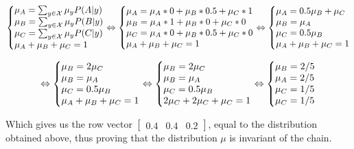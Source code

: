 \documentclass{article}
\begin{document}
\begin{equation}
    \left\{\begin{array}{@{}l@{}}
        \mu_{A} = \sum_{y \in \mathcal{X}} \mu_{y}P(A | y)\\
        \mu_{B} = \sum_{y \in \mathcal{X}} \mu_{y}P(B | y)\\
        \mu_{C} = \sum_{y \in \mathcal{X}} \mu_{y}P(C | y)\\
        \mu_{A} + \mu_{B} + \mu_{C} = 1\\
    \end{array}\right.\notag
    \Leftrightarrow
    \left\{\begin{array}{@{}l@{}}
        \mu_{A} = \mu_{A} * 0 + \mu_{B} * 0.5 + \mu_{C} * 1\\
        \mu_{B} = \mu_{A} * 1 + \mu_{B} * 0 + \mu_{C} * 0\\
        \mu_{C} = \mu_{A} * 0 + \mu_{B} * 0.5 + \mu_{C} * 0\\
        \mu_{A} + \mu_{B} + \mu_{C} = 1\\
    \end{array}\right.
    \Leftrightarrow
    \left\{\begin{array}{@{}l@{}}
        \mu_{A} = 0.5\mu_{B} + \mu_{C}\\
        \mu_{B} = \mu_{A}\\
        \mu_{C} = 0.5\mu_{B}\\
        \mu_{A} + \mu_{B} + \mu_{C} = 1\\
    \end{array}\right.
\end{equation}

\begin{equation}
    \Leftrightarrow
    \left\{\begin{array}{@{}l@{}}
        \mu_{B} = 2\mu_{C}\\
        \mu_{B} = \mu_{A}\\
        \mu_{C} = 0.5\mu_{B}\\
        \mu_{A} + \mu_{B} + \mu_{C} = 1\\
    \end{array}\right.\notag
    \Leftrightarrow
    \left\{\begin{array}{@{}l@{}}
        \mu_{B} = 2\mu_{C}\\
        \mu_{B} = \mu_{A}\\
        \mu_{C} = 0.5\mu_{B}\\
        2\mu_{C} + 2\mu_{C} + \mu_{C} = 1\\
    \end{array}\right.
    \Leftrightarrow
    \left\{\begin{array}{@{}l@{}}
        \mu_{B} = 2/5\\
        \mu_{A} = 2/5\\
        \mu_{C} = 1/5\\
        \mu_{C} = 1/5\\
    \end{array}\right.
\end{equation}

\bigskip

Which gives us the row vector $\begin{bmatrix} 0.4 & 0.4 & 0.2 \end{bmatrix}$, equal to the distribution obtained above, thus proving that the distribution $\mu$ is invariant of the chain.
\end{document}

